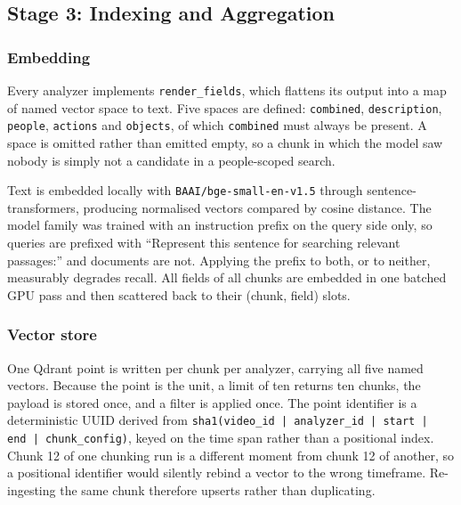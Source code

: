 \subsection{Stage 3: Indexing and Aggregation}

\subsubsection*{Embedding}

Every analyzer implements \texttt{render\_fields}, which flattens its output into a map
of named vector space to text. Five spaces are defined: \texttt{combined},
\texttt{description}, \texttt{people}, \texttt{actions} and \texttt{objects}, of which
\texttt{combined} must always be present. A space is omitted rather than emitted
empty, so a chunk in which the model saw nobody is simply not a candidate in a
people-scoped search.

Text is embedded locally with \texttt{BAAI/bge-small-en-v1.5} through
sentence-transformers, producing normalised vectors compared by cosine distance. The
model family was trained with an instruction prefix on the query side only, so queries
are prefixed with ``Represent this sentence for searching relevant passages:''
and documents are not. Applying the prefix to both, or to neither, measurably degrades
recall. All fields of all chunks are embedded in one batched GPU pass and then
scattered back to their (chunk, field) slots.

\subsubsection*{Vector store}

One Qdrant point is written per chunk per analyzer, carrying all five named vectors.
Because the point is the unit, a limit of ten returns ten chunks, the payload is stored
once, and a filter is applied once. The point identifier is a deterministic UUID derived
from
\texttt{sha1(video\_id\,|\,analyzer\_id\,|\,start\,|\,end\,|\,chunk\_config)}, keyed on
the time span rather than a positional index. Chunk 12 of one chunking run is a
different moment from chunk 12 of another, so a positional identifier would silently
rebind a vector to the wrong timeframe. Re-ingesting the same chunk therefore upserts
rather than duplicating.

